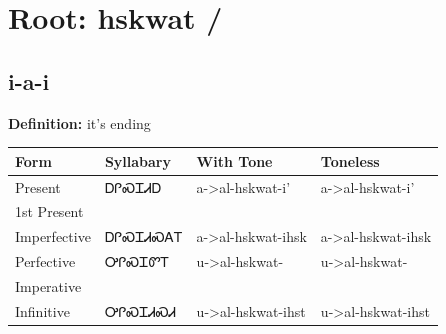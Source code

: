 \documentclass{article}%
\begin{document}
%
\normalsize%
\section*{Root: hskwat / }%
\subsection*{i-a-i}%
\textbf{Definition: }%
it’s ending%
\\[0.5em]%
\begin{tabular}{|l|l|l|l|}%
\hline%
\textbf{Form}&\textbf{Syllabary}&\textbf{With Tone}&\textbf{Toneless}\\%
\hline%
Present&ᎠᎵᏍᏆᏗᎠ&a{-}>al{-}hskwat{-}i'&a{-}>al{-}hskwat{-}i'\\%
1st Present&&&\\%
Imperfective&ᎠᎵᏍᏆᏗᏍᎪᎢ&a{-}>al{-}hskwat{-}ihsk&a{-}>al{-}hskwat{-}ihsk\\%
Perfective&ᎤᎵᏍᏆᏛᎢ&u{-}>al{-}hskwat{-}&u{-}>al{-}hskwat{-}\\%
Imperative&&&\\%
Infinitive&ᎤᎵᏍᏆᏗᏍᏗ&u{-}>al{-}hskwat{-}ihst&u{-}>al{-}hskwat{-}ihst\\%
\hline%
\end{tabular}%
\\[1em]%
\end{document}
